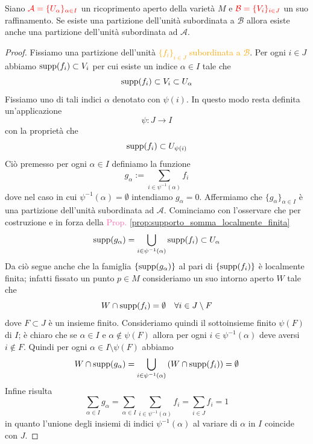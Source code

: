         \begin{lemma}
        \label{lem:partizione_unita_raffinamento}
        \mbox{}

        Siano $\textcolor{red}{\mathcal{A} = \{U_\alpha\}_{\alpha \in I}}$ un ricoprimento aperto della varietà $M$ e $\textcolor{red}{\mathcal{B} = \{V_i\}_{i \in J}}$ un suo raffinamento. Se esiste una partizione dell'unità subordinata a $\mathcal{B}$ allora esiste anche una partizione dell'unità subordinata ad $\mathcal{A}$.
        \end{lemma}

        \begin{proof}
        Fissiamo una partizione dell'unità \textcolor{orange}{$\{f_i\}_{i \in J}$ subordinata a $\mathcal{B}$}. Per ogni $i \in J$ abbiamo $\operatorname{supp}(f_i) \subset V_i$ per cui esiste un indice $\alpha \in I$ tale che
        \[
        \operatorname{supp}(f_i) \subset V_i \subset U_\alpha
        \]
        Fissiamo uno di tali indici $\alpha$ denotato con $\psi(i)$. In questo modo resta definita un'applicazione
        \[
        \psi \colon J \longrightarrow I
        \]
        con la proprietà che
        \[
        \operatorname{supp}(f_i) \subset U_{\psi(i)}
        \]
        Ciò premesso per ogni $\alpha \in I$ definiamo la funzione
        \[
        g_\alpha := \sum_{i \in \psi^{-1}(\alpha)} f_i
        \]
        dove nel caso in cui $\psi^{-1}(\alpha) = \emptyset$ intendiamo $g_\alpha = 0$. Affermiamo che $\{g_\alpha\}_{\alpha \in I}$ è una partizione dell'unità subordinata ad $\mathcal{A}$. Cominciamo con l'osservare che per costruzione e in forza della \textcolor{hotpink}{Prop. \ref{prop:supporto_somma_localmente_finita}}
        \[
        \operatorname{supp}(g_\alpha) = \bigcup_{i \in \psi^{-1}(\alpha)} \operatorname{supp}(f_i) \subset U_\alpha
        \]
        Da ciò segue anche che la famiglia $\{\operatorname{supp}(g_\alpha)\}$ al pari di $\{\operatorname{supp}(f_i)\}$ è localmente finita; infatti fissato un punto $p \in M$ consideriamo un suo intorno aperto $W$ tale che
        \[
        W \cap \operatorname{supp}(f_i) = \emptyset \quad \forall i \in J \setminus F
        \]
        dove $F \subset J$ è un insieme finito. Consideriamo quindi il sottoinsieme finito $\psi(F)$ di $I$; è chiaro che se $\alpha \in I$ e $\alpha \notin \psi(F)$ allora per ogni $i \in \psi^{-1}(\alpha)$ deve aversi $i \notin F$. Quindi per ogni $\alpha \in I \setminus \psi(F)$ abbiamo
        \[
        W \cap \operatorname{supp}(g_\alpha) = \bigcup_{i \in \psi^{-1}(\alpha)} \left(W \cap \operatorname{supp}(f_i)\right) = \emptyset
        \]
        Infine risulta
        \[
        \sum_{\alpha \in I} g_\alpha = \sum_{\alpha \in I} \sum_{i \in \psi^{-1}(\alpha)} f_i = \sum_{i \in J} f_i = 1
        \]
        in quanto l'unione degli insiemi di indici $\psi^{-1}(\alpha)$ al variare di $\alpha$ in $I$ coincide con $J$.
        \end{proof}

